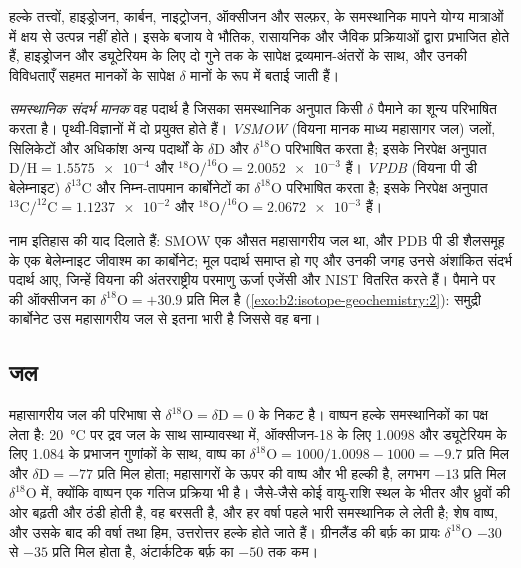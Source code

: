 हल्के तत्त्वों, हाइड्रोजन, कार्बन, नाइट्रोजन, ऑक्सीजन और
सल्फ़र, के समस्थानिक मापने योग्य मात्राओं में क्षय से उत्पन्न नहीं होते। इसके बजाय वे
भौतिक, रासायनिक और जैविक प्रक्रियाओं द्वारा प्रभाजित होते हैं, हाइड्रोजन और ड्यूटेरियम के लिए
दो गुने तक के सापेक्ष द्रव्यमान-अंतरों के साथ, और उनकी
विविधताएँ सहमत मानकों के सापेक्ष $\delta$ मानों के रूप में बताई जाती हैं।

\begin{definition}[समस्थानिक संदर्भ मानक]\label{def:b2:isotope-geochemistry:standards}
\emph{समस्थानिक संदर्भ मानक} वह
पदार्थ है जिसका समस्थानिक अनुपात किसी $\delta$ पैमाने का शून्य परिभाषित करता है। पृथ्वी-विज्ञानों में
दो प्रयुक्त होते हैं। \emph{VSMOW} (वियना मानक माध्य महासागर
जल) जलों, सिलिकेटों और अधिकांश अन्य पदार्थों के $\delta\mathrm{D}$ और $\delta^{18}\mathrm{O}$
परिभाषित करता है; इसके निरपेक्ष अनुपात $\mathrm{D}/\mathrm{H} =
\num{1.5575e-4}$ और $^{18}\mathrm{O}/^{16}\mathrm{O} = \num{2.0052e-3}$ हैं।
\emph{VPDB} (वियना पी डी बेलेम्नाइट) $\delta^{13}\mathrm{C}$
और निम्न-तापमान कार्बोनेटों का $\delta^{18}\mathrm{O}$ परिभाषित करता है; इसके निरपेक्ष अनुपात
$^{13}\mathrm{C}/^{12}\mathrm{C} = \num{1.1237e-2}$ और
$^{18}\mathrm{O}/^{16}\mathrm{O} = \num{2.0672e-3}$ हैं।
\end{definition}

नाम इतिहास की याद दिलाते हैं: SMOW एक औसत महासागरीय जल था, और PDB
पी डी शैलसमूह के एक बेलेम्नाइट जीवाश्म का कार्बोनेट; मूल
पदार्थ समाप्त हो गए और उनकी जगह उनसे अंशांकित संदर्भ पदार्थ आए,
जिन्हें वियना की अंतरराष्ट्रीय परमाणु ऊर्जा एजेंसी और NIST वितरित करते हैं।
 पैमाने पर  की ऑक्सीजन का $\delta^{18}\mathrm{O} = +30.9$ प्रति मिल है
(\cref{exo:b2:isotope-geochemistry:2}): समुद्री कार्बोनेट उस महासागरीय जल से इतना भारी है जिससे वह
बना।

\subsection{जल}

महासागरीय जल  की परिभाषा से $\delta^{18}\mathrm{O} = \delta\mathrm{D} = 0$ के निकट
है। वाष्पन हल्के समस्थानिकों का पक्ष लेता है: \qty{20}{\degreeCelsius} पर द्रव जल
के साथ साम्यावस्था में, ऑक्सीजन-18 के लिए 1.0098 और ड्यूटेरियम के लिए
1.084 के प्रभाजन गुणांकों के साथ, वाष्प का
$\delta^{18}\mathrm{O} = 1000/1.0098 - 1000 = -9.7$ प्रति मिल और $\delta\mathrm{D} =
-77$ प्रति मिल होता; महासागरों के ऊपर की वाष्प और भी हल्की है, लगभग $-13$ प्रति मिल $\delta^{18}\mathrm{O}$ में,
क्योंकि वाष्पन एक गतिज प्रक्रिया भी है।
जैसे-जैसे कोई वायु-राशि स्थल के भीतर और ध्रुवों की ओर बढ़ती और ठंडी होती है, वह बरसती है, और
हर वर्षा पहले भारी समस्थानिक ले लेती है; शेष वाष्प, और उसके बाद की वर्षा तथा
हिम, उत्तरोत्तर हल्के होते जाते हैं। ग्रीनलैंड की बर्फ़ का प्रायः
$\delta^{18}\mathrm{O}$ $-30$ से $-35$ प्रति मिल होता है, अंटार्कटिक बर्फ़ का $-50$ तक कम।

